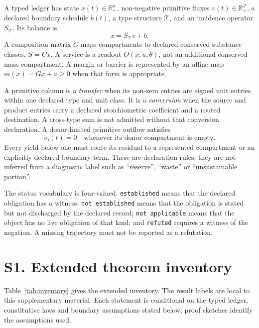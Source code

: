 \documentclass[11pt]{article}
\newcommand{\est}{\texttt{established}}
\newcommand{\nesta}{\texttt{not established}}
\newcommand{\na}{\texttt{not applicable}}
\newcommand{\Rpos}{\mathbb{R}_{+}}
\begin{document}
A typed ledger has state $x(t)\in\Rpos^n$, non-negative primitive fluxes $v(t)\in\Rpos^J$, a declared boundary schedule $b(t)$, a type structure $\mathcal T$, and an incidence operator $S_{\mathcal T}$. Its balance is
\begin{equation}
\dot x=S_{\mathcal T}v+b.\label{eq:s0-balance}
\end{equation}
A composition matrix $C$ maps compartments to declared conserved substance classes, $S=Cx$. A service is a readout $O(x,u,\theta)$, not an additional conserved mass compartment. A margin or barrier is represented by an affine map $m(x)=Gx+a\geq0$ when that form is appropriate.

A primitive column is a \emph{transfer} when its non-zero entries are signed unit entries within one declared type and unit class. It is a \emph{conversion} when the source and product entries carry a declared stoichiometric coefficient and a routed destination. A cross-type sum is not admitted without that conversion declaration. A donor-limited primitive outflow satisfies
\begin{equation}
v_j(t)=0\quad\text{whenever its donor compartment is empty}.\label{eq:s0-donor}
\end{equation}
Every yield below one must route its residual to a represented compartment or an explicitly declared boundary term. These are declaration rules; they are not inferred from a diagnostic label such as ``reserve'', ``waste'' or ``unsustainable portion''.

The status vocabulary is four-valued. \est{} means that the declared obligation has a witness; \nesta{} means that the obligation is stated but not discharged by the declared record; \na{} means that the object has no live obligation of that kind; and \texttt{refuted} requires a witness of the negation. A missing trajectory must not be reported as a refutation.

\section*{S1. Extended theorem inventory}

Table~\ref{tab:inventory} gives the extended inventory. The result labels are local to this supplementary material. Each statement is conditional on the typed ledger, constitutive laws and boundary assumptions stated below; proof sketches identify the assumptions used.
\end{document}
